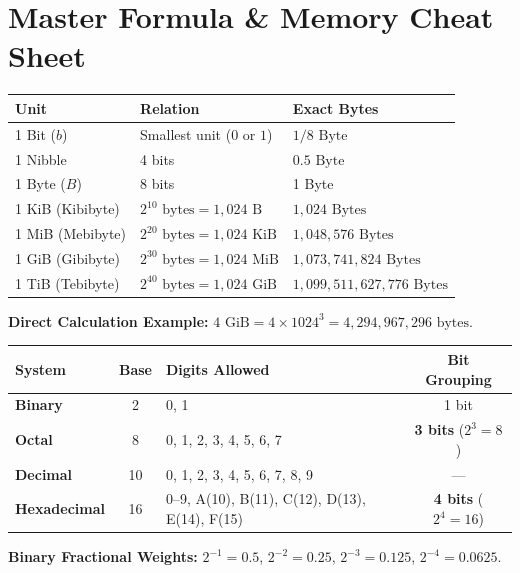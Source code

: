 \documentclass[a4paper,11pt]{article}
\begin{document}
{
\sffamily
\tableofcontents
}
\newpage

\section{Master Formula \& Memory Cheat Sheet}

\begin{formulabox}
\small
\begin{tabular}{@{}l l l@{}}
\toprule
\textbf{Unit} & \textbf{Relation} & \textbf{Exact Bytes} \\
\midrule
1 Bit ($b$) & Smallest unit ($0$ or $1$) & $1/8\text{ Byte}$ \\
1 Nibble & 4 bits & $0.5\text{ Byte}$ \\
1 Byte ($B$) & 8 bits & 1 Byte \\
1 KiB (Kibibyte) & $2^{10}\text{ bytes} = 1,024\text{ B}$ & $1,024\text{ Bytes}$ \\
1 MiB (Mebibyte) & $2^{20}\text{ bytes} = 1,024\text{ KiB}$ & $1,048,576\text{ Bytes}$ \\
1 GiB (Gibibyte) & $2^{30}\text{ bytes} = 1,024\text{ MiB}$ & $1,073,741,824\text{ Bytes}$ \\
1 TiB (Tebibyte) & $2^{40}\text{ bytes} = 1,024\text{ GiB}$ & $1,099,511,627,776\text{ Bytes}$ \\
\bottomrule
\end{tabular}
\vspace{2mm}

\noindent\textbf{Direct Calculation Example:} $4\text{ GiB} = 4 \times 1024^3 = 4,294,967,296\text{ bytes}$.
\end{formulabox}

\begin{formulabox}
\small
\begin{tabular}{@{}l c l c@{}}
\toprule
\textbf{System} & \textbf{Base} & \textbf{Digits Allowed} & \textbf{Bit Grouping} \\
\midrule
\textbf{Binary} & 2 & 0, 1 & 1 bit \\
\textbf{Octal} & 8 & 0, 1, 2, 3, 4, 5, 6, 7 & \textbf{3 bits} ($2^3=8$) \\
\textbf{Decimal} & 10 & 0, 1, 2, 3, 4, 5, 6, 7, 8, 9 & --- \\
\textbf{Hexadecimal} & 16 & 0--9, A(10), B(11), C(12), D(13), E(14), F(15) & \textbf{4 bits} ($2^4=16$) \\
\bottomrule
\end{tabular}
\vspace{2mm}

\noindent\textbf{Binary Fractional Weights:} $2^{-1} = 0.5$, $2^{-2} = 0.25$, $2^{-3} = 0.125$, $2^{-4} = 0.0625$.
\end{formulabox}
\end{document}
